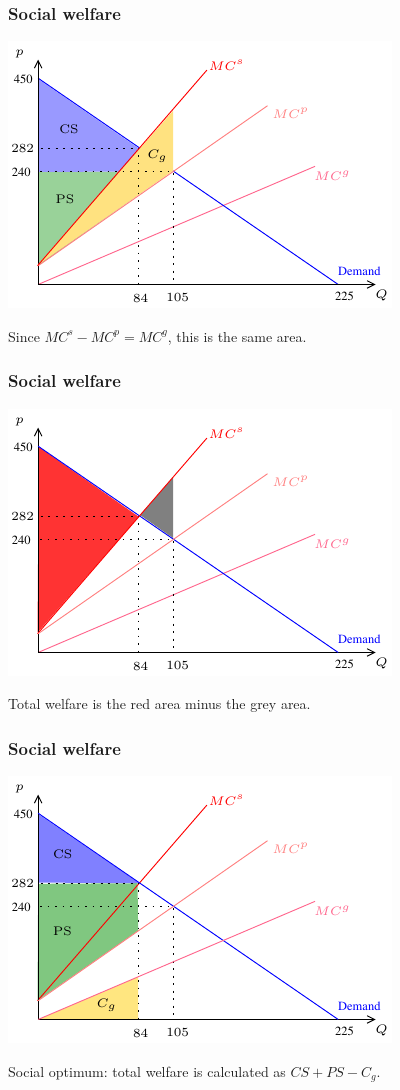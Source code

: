 \documentclass[xcolor=pdftex,dvipsnames]{beamer}
\begin{document}
\begin{frame}
  \frametitle{Social welfare}
  \begin{center}
    \includegraphics{pics/Ext5}
  \end{center}
Since $MC^s - MC^p = MC^g$, this is the same area.
\end{frame}


\begin{frame}
  \frametitle{Social welfare}
  \begin{center}
    \includegraphics{pics/Ext6}
  \end{center}
Total welfare is the red area minus the grey area.
\end{frame}

\begin{frame}
  \frametitle{Social welfare}
  \begin{center}
    \includegraphics{pics/Ext7}
  \end{center}
Social optimum: total welfare is calculated as $CS+PS-C_g$.
\end{frame}
\end{document}
